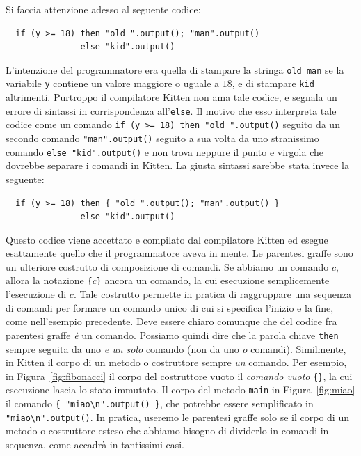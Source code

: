 Si faccia attenzione adesso al seguente codice:
%
\begin{verbatim}
  if (y >= 18) then "old ".output(); "man".output()
               else "kid".output()
\end{verbatim}
%
L'intenzione del programmatore era quella di stampare la stringa
\texttt{old man} se la variabile \texttt{y} contiene un valore maggiore o
uguale a $18$, e di stampare \texttt{kid} altrimenti. Purtroppo il compilatore
Kitten non ama tale codice, e segnala un errore di sintassi in corrispondenza
all'\texttt{else}. Il motivo \e che esso interpreta tale codice come
un comando \verb|if (y >= 18) then "old ".output()| seguito da
un secondo comando \verb|"man".output()| seguito a sua volta
da uno stranissimo comando
\verb|else "kid".output()| e non trova neppure il punto e virgola che
dovrebbe separare i comandi in Kitten. La giusta sintassi sarebbe stata
invece la seguente:
%
\begin{verbatim}
  if (y >= 18) then { "old ".output(); "man".output() }
               else "kid".output()
\end{verbatim}
%
Questo codice viene accettato e compilato dal compilatore Kitten ed esegue
esattamente quello che il programmatore aveva in mente. Le parentesi
graffe sono un ulteriore costrutto di composizione di comandi. Se abbiamo
un comando $c$, allora la notazione \texttt{\{}$c$\texttt{\}} \e ancora
un comando, la cui esecuzione \e semplicemente l'esecuzione di $c$.
Tale costrutto permette in pratica di raggruppare una sequenza di comandi
per formare un comando unico di cui si specifica l'inizio e la fine, come
nell'esempio precedente. Deve essere
chiaro comunque che del codice fra parentesi graffe \emph{\`e} un comando.
Possiamo quindi dire che la parola chiave \texttt{then} \e sempre seguita
da uno \emph{e un solo}
comando (non da uno \emph{o \piu} comandi). Similmente, in Kitten
il corpo di un metodo o costruttore \e sempre \emph{un} comando. Per esempio,
in Figura~\ref{fig:fibonacci} il corpo del costruttore vuoto \e il
\emph{comando vuoto} \verb|{}|, la cui esecuzione lascia lo stato immutato.
Il corpo del metodo \texttt{main} in Figura~\ref{fig:miao}
\e il comando \verb|{ "miao\n".output() }|,
che potrebbe essere semplificato in \verb|"miao\n".output()|. In pratica,
useremo le parentesi graffe solo se il corpo di un metodo o costruttore
\e \cosi esteso che abbiamo bisogno di dividerlo in \piu comandi in sequenza,
come accadr\`a in tantissimi casi.
%
%
